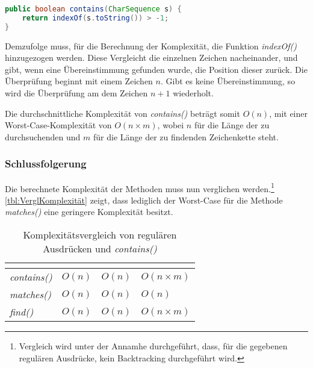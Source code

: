 \begin{lstlisting}[language=Java,caption=Funktionsweise von \textit{contains()},label=lst:contains]
public boolean contains(CharSequence s) {
    return indexOf(s.toString()) > -1;
}
\end{lstlisting}

Demzufolge muss, für die Berechnung der Komplexität, die Funktion \textit{indexOf()} hinzugezogen werden. Diese Vergleicht die einzelnen Zeichen nacheinander, und gibt, wenn eine Übereinstimmung gefunden wurde, die Position dieser zurück. Die Überprüfung beginnt mit einem Zeichen $n$. Gibt es keine Übereinstimmung, so wird die Überprüfung am dem Zeichen $n+1$ wiederholt.

Die durchschnittliche Komplexität von \textit{contains()} beträgt somit $O(n)$, mit einer Worst-Case-Komplexität von $O(n \times m)$, wobei $n$ für die Länge der zu durchsuchenden und $m$ für die Länge der zu findenden Zeichenkette steht. 

\subsubsection{Schlussfolgerung}
Die berechnete Komplexität der Methoden muss nun verglichen werden.\footnote{Vergleich wird unter der Annamhe durchgeführt, dass, für die gegebenen regulären Ausdrücke, kein Backtracking durchgeführt wird.} \autoref{tbl:VerglKomplexität} zeigt, dass lediglich der Worst-Case für die Methode \textit{matches()} eine geringere Komplexität besitzt. 

\begin{table}
	\centering
	\begin{tabular}{| l | l | l | l |}
		\hline
		\rowcolor[HTML]{3531FF} 
		\multicolumn{1}{|l|}{\cellcolor[HTML]{4F88BB}{\color[HTML]{FFFFFF} {\bf Methode}}} & \multicolumn{1}{l|}{\cellcolor[HTML]{4F88BB}{\color[HTML]{FFFFFF} {\bf Best-Case}}} & \multicolumn{1}{l|}{\cellcolor[HTML]{4F88BB}{\color[HTML]{FFFFFF} {\bf Durchschnitt}}} & \multicolumn{1}{l|}{\cellcolor[HTML]{4F88BB}{\color[HTML]{FFFFFF} {\bf Worst-Case}}} \\ \hline
		\textit{contains()} & $O(n)$ & $O(n)$ & $O(n \times m)$ \\  \hline \hline
		\textit{matches()} & $O(n)$ & $O(n)$ & $O(n)$ \\ \hline
		\textit{find()} & $O(n)$ & $O(n)$ & $O(n \times m)$ \\  \hline
	\end{tabular}
	\caption{Komplexitätsvergleich von regulären Ausdrücken und \textit{contains()}}
	\label{tbl:VerglKomplexität}
\end{table}


